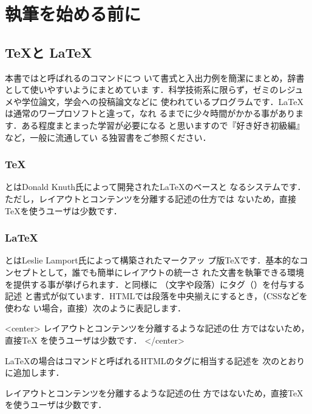 \chapter{執筆を始める前に}

\section{\TeX と \LaTeX}
本書ではと呼ばれるのコマンドにつ
いて書式と入出力例を簡潔にまとめ，辞書として使いやすいようにまとめていま
す．科学技術系に限らず，ゼミのレジュメや学位論文，学会への投稿論文などに
使われているプログラムです．\LaTeX は通常のワープロソフトと違って，なれ
るまでに少々時間がかかる事があります．ある程度まとまった学習が必要になる
と思いますので『好き好き\LaTeXe 初級編』\cite{jou}など，一般に流通してい
る独習書をご参照ください．

\subsection{\TeX}
とはDonald Knuth氏によって開発された\LaTeX のベースと
なるシステムです．ただし，レイアウトとコンテンツを分離する記述の仕方では
ないため，直接\TeX を使うユーザは少数です．

\subsection{\LaTeX}
とはLeslie Lamport氏によって構築されたマークアッ
プ版\TeX です．基本的なコンセプトとして，誰でも簡単にレイアウトの統一さ
れた文書を執筆できる環境を提供する事が挙げられます．と同様に
（文字や段落）にタグ（）を付与する記述
と書式が似ています．HTMLでは段落を中央揃えにするとき，（CSSなどを使わな
い場合，直接）次のように表記します．

\begin{intext}
<center>
  レイアウトとコンテンツを分離するような記述の仕
  方ではないため，直接TeX を使うユーザは少数です．
</center>
\end{intext}

\noindent
\LaTeX の場合はコマンドと呼ばれるHTMLのタグに相当する記述を
次のとおりに追加します．
\begin{intext}
\begin{center}
 レイアウトとコンテンツを分離するような記述の仕
 方ではないため，直接\TeX を使うユーザは少数です．
\end{center}
\end{intext}


